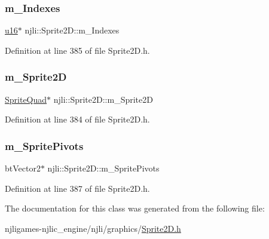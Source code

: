 \subsubsection{\texorpdfstring{m\+\_\+\+Indexes}{m\_Indexes}}
{\footnotesize\ttfamily \mbox{\hyperlink{_util_8h_a9e6c91d77e24643b888dbd1a1a590054}{u16}}$\ast$ njli\+::\+Sprite2\+D\+::m\+\_\+\+Indexes\hspace{0.3cm}{\ttfamily [private]}}



Definition at line 385 of file Sprite2\+D.\+h.

\mbox{\label{classnjli_1_1_sprite2_d_a0fad1694353e933dcd9793b071ff126b}} 
\subsubsection{\texorpdfstring{m\+\_\+\+Sprite2D}{m\_Sprite2D}}
{\footnotesize\ttfamily \mbox{\hyperlink{classnjli_1_1_sprite2_d_1_1_sprite_quad}{Sprite\+Quad}}$\ast$ njli\+::\+Sprite2\+D\+::m\+\_\+\+Sprite2D\hspace{0.3cm}{\ttfamily [private]}}



Definition at line 384 of file Sprite2\+D.\+h.

\mbox{\label{classnjli_1_1_sprite2_d_a11de2ec387edcd23e7b0508e00e4266b}} 
\subsubsection{\texorpdfstring{m\+\_\+\+Sprite\+Pivots}{m\_SpritePivots}}
{\footnotesize\ttfamily bt\+Vector2$\ast$ njli\+::\+Sprite2\+D\+::m\+\_\+\+Sprite\+Pivots\hspace{0.3cm}{\ttfamily [private]}}



Definition at line 387 of file Sprite2\+D.\+h.



The documentation for this class was generated from the following file\+:\begin{DoxyCompactItemize}
\item 
njligames-\/njlic\+\_\+engine/njli/graphics/\mbox{\hyperlink{_sprite2_d_8h}{Sprite2\+D.\+h}}\end{DoxyCompactItemize}
